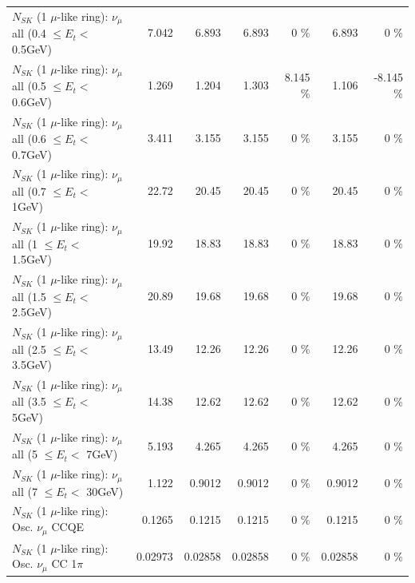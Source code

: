 \begin{table}
\begin{tabular}{| l | r | r | r  r | r  r |}
       $N_{SK}$ (1 $\mu$-like ring): $\nu_{\mu}$ all (0.4 $\leq E_{t} <$ 0.5GeV) &           7.042 &           6.893 &           6.893 &        0 \%  &           6.893 &        0 \%  \\ 
       $N_{SK}$ (1 $\mu$-like ring): $\nu_{\mu}$ all (0.5 $\leq E_{t} <$ 0.6GeV) &           1.269 &           1.204 &           1.303 &    8.145 \%  &           1.106 &   -8.145 \%  \\ 
       $N_{SK}$ (1 $\mu$-like ring): $\nu_{\mu}$ all (0.6 $\leq E_{t} <$ 0.7GeV) &           3.411 &           3.155 &           3.155 &        0 \%  &           3.155 &        0 \%  \\ 
         $N_{SK}$ (1 $\mu$-like ring): $\nu_{\mu}$ all (0.7 $\leq E_{t} <$ 1GeV) &           22.72 &           20.45 &           20.45 &        0 \%  &           20.45 &        0 \%  \\ 
         $N_{SK}$ (1 $\mu$-like ring): $\nu_{\mu}$ all (1 $\leq E_{t} <$ 1.5GeV) &           19.92 &           18.83 &           18.83 &        0 \%  &           18.83 &        0 \%  \\ 
       $N_{SK}$ (1 $\mu$-like ring): $\nu_{\mu}$ all (1.5 $\leq E_{t} <$ 2.5GeV) &           20.89 &           19.68 &           19.68 &        0 \%  &           19.68 &        0 \%  \\ 
       $N_{SK}$ (1 $\mu$-like ring): $\nu_{\mu}$ all (2.5 $\leq E_{t} <$ 3.5GeV) &           13.49 &           12.26 &           12.26 &        0 \%  &           12.26 &        0 \%  \\ 
         $N_{SK}$ (1 $\mu$-like ring): $\nu_{\mu}$ all (3.5 $\leq E_{t} <$ 5GeV) &           14.38 &           12.62 &           12.62 &        0 \%  &           12.62 &        0 \%  \\ 
           $N_{SK}$ (1 $\mu$-like ring): $\nu_{\mu}$ all (5 $\leq E_{t} <$ 7GeV) &           5.193 &           4.265 &           4.265 &        0 \%  &           4.265 &        0 \%  \\ 
          $N_{SK}$ (1 $\mu$-like ring): $\nu_{\mu}$ all (7 $\leq E_{t} <$ 30GeV) &           1.122 &          0.9012 &          0.9012 &        0 \%  &          0.9012 &        0 \%  \\ 
\hline
\hline
                               $N_{SK}$ (1 $\mu$-like ring): Osc. $\nu_\mu$ CCQE &          0.1265 &          0.1215 &          0.1215 &        0 \%  &          0.1215 &        0 \%  \\ 
                          $N_{SK}$ (1 $\mu$-like ring): Osc. $\nu_\mu$ CC 1$\pi$ &         0.02973 &         0.02858 &         0.02858 &        0 \%  &         0.02858 &        0 \%  \\ 

\end{tabular}
\end{table}
